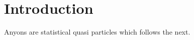 \section{Introduction} \label{sec:outline}
    Anyons are statistical quasi particles which follows the next. 